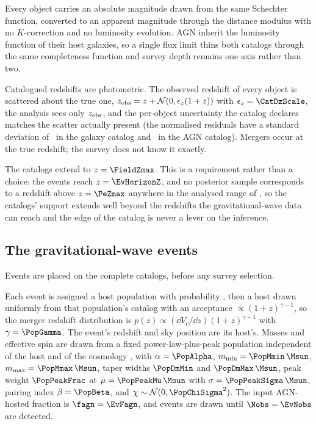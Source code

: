 Every object carries an absolute magnitude drawn from the same Schechter
function, converted to an apparent magnitude through the distance modulus with
no $K$-correction and no luminosity evolution. AGN inherit the luminosity
function of their host galaxies, so a single flux limit thins both catalogs
through the same completeness function and survey depth remains one axis rather
than two.

Catalogued redshifts are photometric. The observed redshift of every object is
scattered about the true one, $z_{\rm obs} = z + \mathcal{N}(0,
\epsilon_z(1+z))$ with $\epsilon_z = \CatDzScale$, the analysis sees only
$z_{\rm obs}$, and the per-object uncertainty the catalog declares matches the
scatter actually present (the normalised residuals have a standard deviation
of \CatPhotozPullSd\ in the galaxy catalog and \CatPhotozPullSdAgn\ in the AGN
catalog). Mergers occur at the true redshift; the survey does not know it
exactly.

The catalogs extend to $z = \FieldZmax$. This is a requirement rather than a
choice: the events reach $z = \EvHorizonZ$, and no posterior sample corresponds
to a redshift above $z = \PeZmax$ anywhere in the analysed range of \Hz, so the
catalogs' support extends well beyond the redshifts the gravitational-wave data
can reach and the edge of the catalog is never a lever on the inference.

\subsection{The gravitational-wave events}
\label{sec:data:events}

Events are placed on the complete catalogs, before any survey selection.

Each event is assigned a host population with probability \fagn, then a host
drawn uniformly from that population's catalog with an acceptance
$\propto (1+z)^{\gamma-1}$, so the merger redshift distribution is
$p(z) \propto (\dd V_c/\dd z)(1+z)^{\gamma-1}$ with $\gamma = \PopGamma$. The
event's redshift and sky position are its host's. Masses and effective spin are
drawn from a fixed power-law-plus-peak population independent of the host and
of the cosmology \citep{GWTC3Pop2023}, with $\alpha = \PopAlpha$,
$m_{\min} = \PopMmin\,\Msun$, $m_{\max} = \PopMmax\,\Msun$, taper widths
$\PopDmMin$ and $\PopDmMax\,\Msun$, peak weight $\PopPeakFrac$ at
$\mu = \PopPeakMu\,\Msun$ with $\sigma = \PopPeakSigma\,\Msun$, pairing index
$\beta = \PopBeta$, and $\chi \sim \mathcal{N}(0, \PopChiSigma^2)$. The input
AGN-hosted fraction is $\fagn = \EvFagn$, and events are drawn until
$\Nobs = \EvNobs$ are detected.

